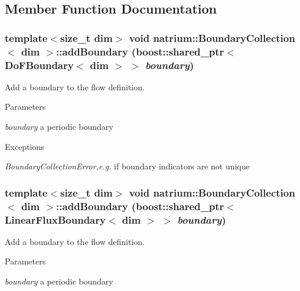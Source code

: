 \subsection{Member Function Documentation}
\hypertarget{classnatrium_1_1BoundaryCollection_aeb04961249e675666c092afd721ad32a}{
\subsubsection[{addBoundary}]{\setlength{\rightskip}{0pt plus 5cm}template$<$size\_\-t dim$>$ void {\bf natrium::BoundaryCollection}$<$ dim $>$::addBoundary (boost::shared\_\-ptr$<$ {\bf DoFBoundary}$<$ dim $>$ $>$ {\em boundary})}}
\label{classnatrium_1_1BoundaryCollection_aeb04961249e675666c092afd721ad32a}


Add a boundary to the flow definition. 
\begin{DoxyParams}{Parameters}
\item[{\em boundary}]a periodic boundary \end{DoxyParams}

\begin{DoxyExceptions}{Exceptions}
\item[{\em BoundaryCollectionError,e.g.}]if boundary indicators are not unique \end{DoxyExceptions}
\hypertarget{classnatrium_1_1BoundaryCollection_aa248c47170036538ef052940123b2322}{
\subsubsection[{addBoundary}]{\setlength{\rightskip}{0pt plus 5cm}template$<$size\_\-t dim$>$ void {\bf natrium::BoundaryCollection}$<$ dim $>$::addBoundary (boost::shared\_\-ptr$<$ {\bf LinearFluxBoundary}$<$ dim $>$ $>$ {\em boundary})}}
\label{classnatrium_1_1BoundaryCollection_aa248c47170036538ef052940123b2322}


Add a boundary to the flow definition. 
\begin{DoxyParams}{Parameters}
\item[{\em boundary}]a periodic boundary \end{DoxyParams}

